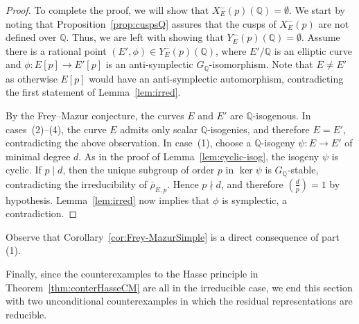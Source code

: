 \documentclass[12pt]{amsart}
\numberwithin{equation}{section}
\theoremstyle{definition}
\newcommand{\Q}{\mathbb{Q}}
\newcommand{\rhobar}{{\overline{\rho}}}
\newcommand{\Xp}{X_E^{-}(p)}
\begin{document}
\begin{proof}
To complete the proof, we will show that $\Xp(\Q) = \emptyset$. We start by noting that Proposition~\ref{prop:cuspsQ} assures that the cusps of $\Xp$ are not defined over $\Q$. Thus, we are left with showing that $Y^-_E(p)(\Q) = \emptyset$. Assume there is a rational point $(E', \phi) \in Y^-_E(p)(\Q)$, where $E'/\Q$ is an elliptic curve and 
$\phi : E[p] \to E'[p]$ is an anti-symplectic $G_\Q$-isomorphism. Note that $E\neq E'$ as otherwise $E[p]$ would have an anti-symplectic automorphism, contradicting the first statement of Lemma~\ref{lem:irred}.

By the Frey--Mazur conjecture, the curves \(E\) and \(E'\) are
\(\Q\)-isogenous.
In cases~\textup{(2)}--\textup{(4)}, the curve \(E\) admits only
scalar \(\Q\)-isogenies, and therefore \(E=E'\), contradicting the
above observation.
In case~\textup{(1)}, choose a \(\Q\)-isogeny
$\psi\colon E\longrightarrow E'$ 
of minimal degree \(d\). As in the proof of
Lemma~\ref{lem:cyclic-isog}, the isogeny \(\psi\) is cyclic. If
\(p\mid d\), then the unique subgroup of order \(p\) in
\(\ker\psi\) is \(G_\Q\)-stable, contradicting the irreducibility of
\(\rhobar_{E,p}\). Hence \(p\nmid d\), and therefore
$\left(\frac{d}{p}\right)=1$
by hypothesis. Lemma~\ref{lem:irred} now implies that \(\phi\) is
symplectic, a contradiction.
\end{proof}

Observe that Corollary~\ref{cor:Frey-MazurSimple} is a direct consequence of part (1). 

Finally, since the counterexamples to the Hasse principle in Theorem~\ref{thm:conterHasseCM} are all in the irreducible case, 
we end this section with two unconditional counterexamples in which the residual representations are reducible.
\end{document}
